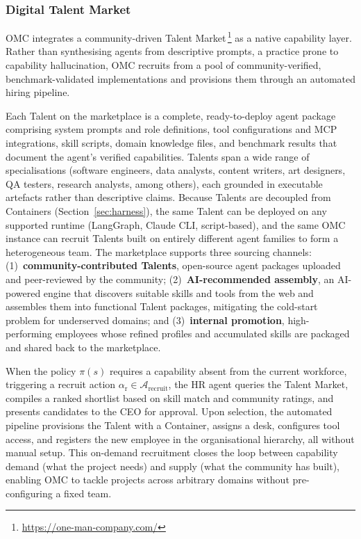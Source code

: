 \documentclass[11pt,a4paper]{article}
\begin{document}
\subsubsection{Digital Talent Market}
\label{sec:talent-market}

OMC integrates a community-driven Talent Market\,\footnote{\url{https://one-man-company.com/}} as a native capability layer.  Rather than synthesising agents from descriptive prompts, a practice prone to capability hallucination, OMC recruits from a pool of community-verified, benchmark-validated implementations and provisions them through an automated hiring pipeline.

Each Talent on the marketplace is a complete, ready-to-deploy agent package comprising system prompts and role definitions, tool configurations and MCP integrations, skill scripts, domain knowledge files, and benchmark results that document the agent's verified capabilities.  Talents span a wide range of specialisations (software engineers, data analysts, content writers, art designers, QA testers, research analysts, among others), each grounded in executable artefacts rather than descriptive claims.  Because Talents are decoupled from Containers (Section~\ref{sec:harness}), the same Talent can be deployed on any supported runtime (LangGraph, Claude CLI, script-based), and the same OMC instance can recruit Talents built on entirely different agent families to form a heterogeneous team.  The marketplace supports three sourcing channels: (1)~\textbf{community-contributed Talents}, open-source agent packages uploaded and peer-reviewed by the community; (2)~\textbf{AI-recommended assembly}, an AI-powered engine that discovers suitable skills and tools from the web and assembles them into functional Talent packages, mitigating the cold-start problem for underserved domains; and (3)~\textbf{internal promotion}, high-performing employees whose refined profiles and accumulated skills are packaged and shared back to the marketplace.

When the policy $\pi(s)$ requires a capability absent from the current workforce, triggering a recruit action $\alpha_{\text{r}} \in \mathcal{A}_{\text{recruit}}$, the HR agent queries the Talent Market, compiles a ranked shortlist based on skill match and community ratings, and presents candidates to the CEO for approval.  Upon selection, the automated pipeline provisions the Talent with a Container, assigns a desk, configures tool access, and registers the new employee in the organisational hierarchy, all without manual setup.  This on-demand recruitment closes the loop between capability demand (what the project needs) and supply (what the community has built), enabling OMC to tackle projects across arbitrary domains without pre-configuring a fixed team.
\end{document}
